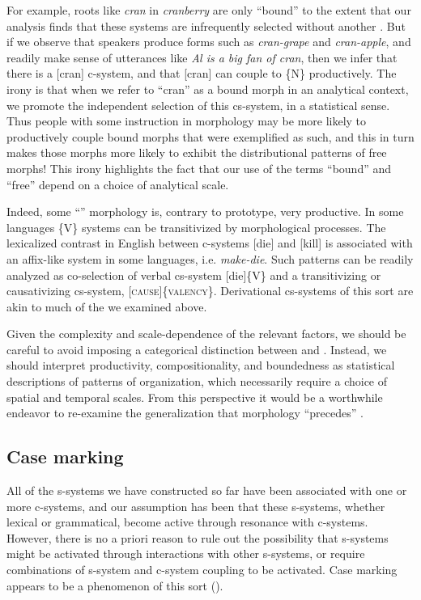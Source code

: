   For example, roots like \textit{cran} in \textit{cranberry} are only “bound” to the extent that our analysis finds that these systems are infrequently selected without another . But if we observe that speakers produce forms such as \textit{cran-grape} and \textit{cran-apple}, and readily make sense of utterances like \textit{Al is a big fan of cran}, then we infer that there is a [cran] c-system, and that [cran] can couple to \{N\} productively. The irony is that when we refer to “cran” as a bound morph in an analytical context, we promote the independent selection of this cs-system, in a statistical sense. Thus people with some instruction in morphology may be more likely to productively couple bound morphs that were exemplified as such, and this in turn makes those morphs more likely to exhibit the distributional patterns of free morphs! This irony highlights the fact that our use of the terms “bound” and “free” depend on a choice of analytical scale.

  Indeed, some “” morphology is, contrary to prototype, very productive. In some languages  \{V\} systems can be transitivized by morphological processes. The lexicalized  contrast in English between c-systems [die] and [kill] is associated with an affix-like system in some languages, i.e. \textit{make-die}. Such patterns can be readily analyzed as co-selection of verbal cs-system [die]\{V\} and a transitivizing or causativizing cs-system, [\textsc{cause}]\{\textsc{valency}\}. Derivational cs-systems of this sort are akin to much of the  we examined above. 

  Given the complexity and scale-dependence of the relevant factors, we should be careful to avoid imposing a categorical distinction between  and . Instead, we should interpret productivity, compositionality, and boundedness as statistical descriptions of patterns of organization, which necessarily require a choice of spatial and temporal scales. From this perspective it would be a worthwhile endeavor to re-examine the generalization that  morphology “precedes”  \citep{Booij1996}.

\subsection{Case marking}

All of the s-systems we have constructed so far have been associated with one or more c-systems, and our assumption has been that these s-systems, whether lexical or grammatical, become active through resonance with c-systems. However, there is no a priori reason to rule out the possibility that s-systems might be activated through interactions with other s-systems, or require combinations of s-system and c-system coupling to be activated. Case marking appears to be a phenomenon of this sort (\citealt{BobaljikWurmbrand2008,MalchukovSpencer2008}).

